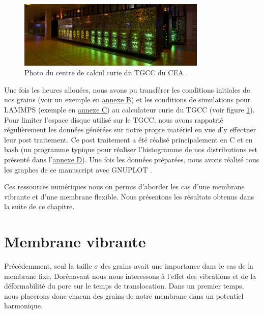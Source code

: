 \begin{figure}[H]
\begin{center}
\includegraphics[width=0.8\textwidth]{Curie-M2012_011_Vue_002.jpg}

\caption[TGCC du CEA]{Photo du centre de calcul curie du TGCC du CEA \cite{tgcc}.}
\label{tgcc}
\end{center}
\end{figure}


Une fois les heures allouées, nous avons pu transférer les conditions initiales de nos grains (voir un exemple en \hyperref[annexeb]{annexe B}) et les conditions de simulations pour LAMMPS (exemple en \hyperref[annexec]{annexe C}) au calculateur curie du TGCC (voir figure \ref{tgcc}). Pour limiter l'espace disque utilisé sur le TGCC, nous avons rappatrié régulièrement les données générées sur notre propre matériel en vue d'y effectuer leur post traitement. Ce post traitement a été réalisé principalement en C et en bash (un programme typique pour réaliser l'histogramme de nos distributions est présenté dans l'\hyperref[annexed]{annexe D}). Une fois les données préparées, nous avons réalisé tous les graphes de ce manuscript avec GNUPLOT \cite{gnuplot}.

Ces ressources numériques nous on permis d'aborder les cas d'une membrane vibrante et d'une membrane flexible. Nous présentons les résultats obtenus dans la suite de ce chapitre.



\newpage


\section{Membrane vibrante}
\label{chapitremembvib}

Précédemment, seul la taille $\sigma$ des grains avait une importance dans le cas de la membrane fixe. Dorénavant nous nous interessons à l'effet des vibrations et de la déformabilité du pore sur le temps de translocation. Dans un premier temps, nous placerons donc chacun des grains de notre membrane dans un potentiel harmonique.\\

